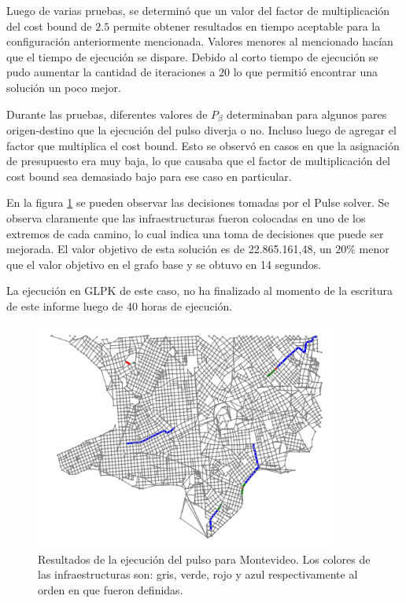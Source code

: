 \documentclass{article}
\begin{document}
  Luego de varias pruebas, se determinó que un valor del factor de multiplicación del cost bound de $2.5$ permite obtener resultados en tiempo aceptable para la configuración anteriormente mencionada. Valores menores al mencionado hacían que el tiempo de ejecución se dispare. Debido al corto tiempo de ejecución se pudo aumentar la cantidad de iteraciones a $20$ lo que permitió encontrar una solución un poco mejor.
  
  Durante las pruebas, diferentes valores de $P_{\beta}$ determinaban para algunos pares origen-destino que la ejecución del pulso diverja o no. Incluso luego de agregar el factor que multiplica el cost bound. Esto se observó en casos en que la asignación de presupuesto era muy baja, lo que causaba que el factor de multiplicación del cost bound sea demasiado bajo para ese caso en particular.
  
  En la figura \ref{resultadosmontevideo} se pueden observar las decisiones tomadas por el Pulse solver. Se observa claramente que las infraestructuras fueron colocadas en uno de los extremos de cada camino, lo cual indica una toma de decisiones que puede ser mejorada. El valor objetivo de esta solución es de 22.865.161,48, un $20\%$ menor que el valor objetivo en el grafo base y se obtuvo en 14 segundos.

  La ejecución en GLPK de este caso, no ha finalizado al momento de la escritura de este informe luego de 40 horas de ejecución.

  \begin{figure}[h!]
    \centering
    \includegraphics[width=10cm]{imgs/mdeo_large_pulse.png}
    \caption{Resultados de la ejecución del pulso para Montevideo. Los colores de las infraestructuras son: gris, verde, rojo y azul respectivamente al orden en que fueron definidas.}
    \label{resultadosmontevideo}
  \end{figure}
\end{document}
